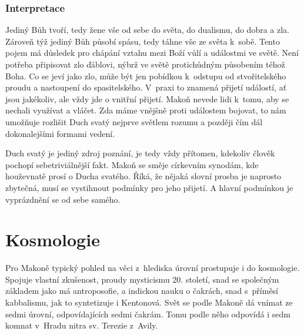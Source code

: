 \subsubsection*{Interpretace}

Jediný Bůh tvoří, tedy žene vše od sebe do světa, do dualismu, do dobra a zla.
Zároveň týž jediný Bůh působí spásu, tedy táhne vše ze světa k~sobě. Tento pojem
má důsledek pro chápání vztahu mezi Boží vůlí a událostmi ve světě. Není potřeba
připisovat zlo ďáblovi, nýbrž ve světě protichůdným působením téhož Boha. Co se
jeví jako zlo, může být jen pobídkou k~odstupu od stvořitelského proudu a
nastoupení do spasitelského. V~praxi to znamená přijetí událostí, ať jsou
jakékoliv, ale vždy jde o vnitřní přijetí. Makoň nevede lidi k~tomu, aby se
nechali využívat a vláčet. Zda máme vnějšně proti událostem bojovat, to nám
umožňuje rozlišit Duch svatý nejprve světlem rozumu a později čím dál
dokonalejšími formami vedení.

Duch svatý je jediný zdroj poznání, je tedy vždy přítomen, kdekoliv člověk
pochopí sebetriviálnější fakt. Makoň se směje
církevním synodám, kde houževnatě prosí o Ducha svatého. Říká,
že nějaká slovní prosba je naprosto zbytečná, musí se vystihnout podmínky pro
jeho přijetí. A hlavní podmínkou je vyprázdnění se od sebe samého.

\section{Kosmologie}

Pro Makoně typický pohled na věci z~hlediska úrovní prostupuje i do kosmologie.
Spojuje vlastní zkušenost, proudy mysticismu 20. století, snad se společným
základem jako má antroposofie\cite{Bezdek2009thesis}, a indickou nauku o
čakrách\cite{atwell2013osi}, snad s~příměsí kabbalismu, jak to syntetizuje i
Kentonová\cite{kenton2015kabbalistic}. Svět se podle Makoně dá vnímat ze sedmi
úrovní, odpovídajících sedmi čakrám. Tomu podle něho odpovídá i sedm komnat v~Hradu
nitra\cite{teresa1588castillo} sv. Terezie z~Avily.

